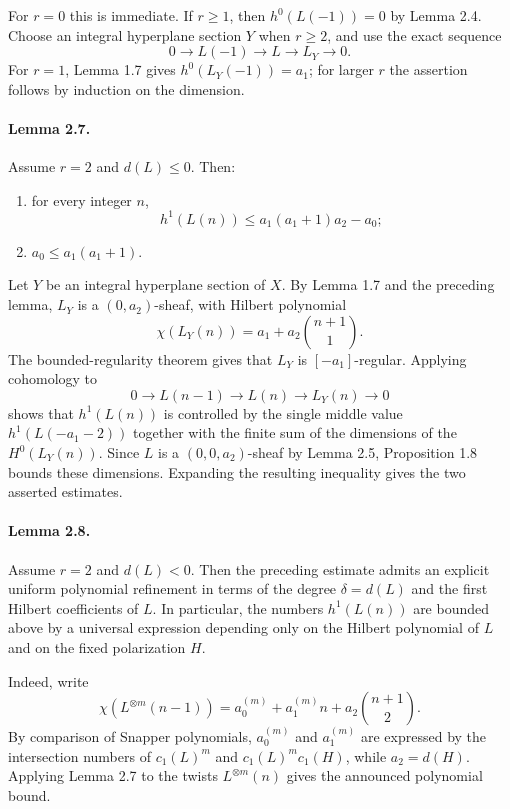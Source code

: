 \documentclass[11pt]{article}
\theoremstyle{plain}
\theoremstyle{definition}
\theoremstyle{remark}
\begin{document}
For $r=0$ this is immediate. If $r\geq1$, then $h^0(L(-1))=0$ by Lemma 2.4. Choose an integral hyperplane section $Y$ when $r\geq2$, and use the exact sequence
\[
0\to L(-1)\to L\to L_Y\to0.
\]
For $r=1$, Lemma 1.7 gives $h^0(L_Y(-1))=a_1$; for larger $r$ the assertion follows by induction on the dimension.

\paragraph{Lemma 2.7.}
Assume $r=2$ and $d(L)\leq0$. Then:
\begin{enumerate}[label=\roman*)]
\item for every integer $n$,
\[
h^1(L(n))\leq a_1(a_1+1)a_2-a_0;
\]
\item $a_0\leq a_1(a_1+1)$.
\end{enumerate}

Let $Y$ be an integral hyperplane section of $X$. By Lemma 1.7 and the preceding lemma, $L_Y$ is a $(0,a_2)$-sheaf, with Hilbert polynomial
\[
\chi(L_Y(n))=a_1+a_2\binom{n+1}{1}.
\]
The bounded-regularity theorem gives that $L_Y$ is $[-a_1]$-regular. Applying cohomology to
\[
0\to L(n-1)\to L(n)\to L_Y(n)\to0
\]
shows that $h^1(L(n))$ is controlled by the single middle value $h^1(L(-a_1-2))$ together with the finite sum of the dimensions of the $H^0(L_Y(n))$. Since $L$ is a $(0,0,a_2)$-sheaf by Lemma 2.5, Proposition 1.8 bounds these dimensions. Expanding the resulting inequality gives the two asserted estimates.

\paragraph{Lemma 2.8.}
Assume $r=2$ and $d(L)<0$. Then the preceding estimate admits an explicit uniform polynomial refinement in terms of the degree $\delta=d(L)$ and the first Hilbert coefficients of $L$. In particular, the numbers $h^1(L(n))$ are bounded above by a universal expression depending only on the Hilbert polynomial of $L$ and on the fixed polarization $H$.

Indeed, write
\[
\chi(L^{\otimes m}(n-1))=a_0^{(m)}+a_1^{(m)}n+a_2\binom{n+1}{2}.
\]
By comparison of Snapper polynomials, $a_0^{(m)}$ and $a_1^{(m)}$ are expressed by the intersection numbers of $c_1(L)^m$ and $c_1(L)^m c_1(H)$, while $a_2=d(H)$. Applying Lemma 2.7 to the twists $L^{\otimes m}(n)$ gives the announced polynomial bound.
\end{document}
